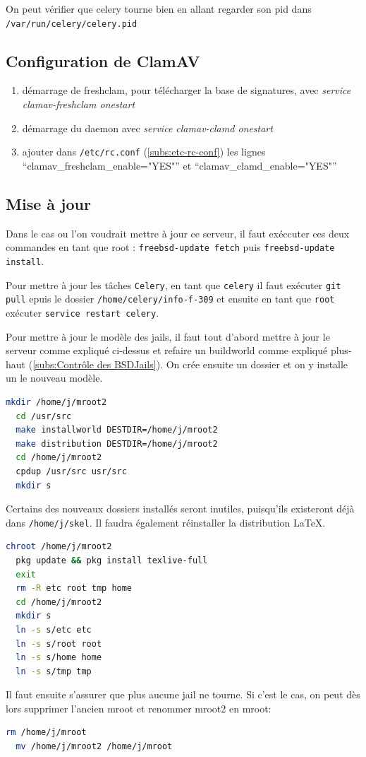 \documentclass[10pt,a4paper]{article}
\begin{document}
On peut vérifier que celery tourne bien en allant regarder son pid dans \texttt{/var/run/celery/celery.pid}

\subsection{Configuration de ClamAV}
\begin{enumerate}
  \item démarrage de freshclam, pour télécharger la base de signatures, avec \emph{service clamav-freshclam onestart}
  \item démarrage du daemon avec \emph{service clamav-clamd onestart}
  \item ajouter dans \texttt{/etc/rc.conf} (\ref{subs:etc-rc-conf}) les lignes ``clamav\_freshclam\_enable="YES"'' et ``clamav\_clamd\_enable="YES"''
\end{enumerate}

\subsection{Mise à jour}

Dans le cas ou l'on voudrait mettre à jour ce serveur,
il faut exéccuter ces deux commandes en tant que root :
\texttt{freebsd-update fetch} puis \texttt{freebsd-update install}.

Pour mettre à jour les tâches \texttt{Celery},
en tant que \texttt{celery} il faut exécuter \texttt{git pull}
epuis le dossier \texttt{/home/celery/info-f-309}
et ensuite en tant que \texttt{root} exécuter \texttt{service restart celery}.

Pour mettre à jour le modèle des jails, il faut tout d'abord mettre à jour le serveur comme expliqué ci-dessus et refaire un buildworld comme expliqué plus-haut (\ref{subs:Contrôle des BSDJails}). On crée ensuite un dossier et on y installe un le nouveau modèle.
\begin{lstlisting}[language=bash]
  mkdir /home/j/mroot2
  cd /usr/src
  make installworld DESTDIR=/home/j/mroot2
  make distribution DESTDIR=/home/j/mroot2
  cd /home/j/mroot2
  cpdup /usr/src usr/src
  mkdir s
\end{lstlisting}
Certains des nouveaux dossiers installés seront inutiles, puisqu'ils existeront déjà dans \texttt{/home/j/skel}. Il faudra également réinstaller la distribution \LaTeX.
\begin{lstlisting}[language=bash]
  chroot /home/j/mroot2
  pkg update && pkg install texlive-full
  exit
  rm -R etc root tmp home
  cd /home/j/mroot2
  mkdir s
  ln -s s/etc etc
  ln -s s/root root
  ln -s s/home home
  ln -s s/tmp tmp
\end{lstlisting}
Il faut ensuite s'assurer que plus aucune jail ne tourne. Si c'est le cas, on peut dès lors supprimer l'ancien mroot et renommer mroot2 en mroot:
\begin{lstlisting}[language=bash]
  rm /home/j/mroot
  mv /home/j/mroot2 /home/j/mroot
\end{lstlisting}
\end{document}
